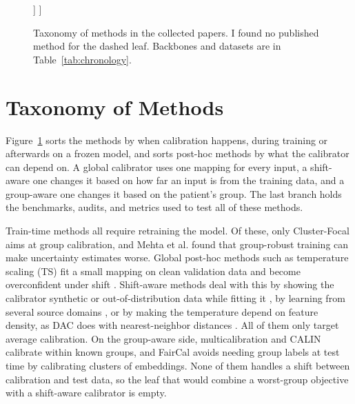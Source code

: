\documentclass[sigconf,nonacm]{acmart}
\begin{document}
\begin{figure}[t]
\begin{forest}
      ]
    ]
  \end{forest}
  \caption{Taxonomy of methods in the collected papers. I found no published method for the dashed leaf. Backbones and datasets are in Table~\ref{tab:chronology}.}
  \label{fig:taxonomy}
\end{figure}

\section{Taxonomy of Methods}
\label{sec:taxonomy}

Figure~\ref{fig:taxonomy} sorts the methods by when calibration happens, during training or afterwards on a frozen model, and sorts post-hoc methods by what the calibrator can depend on. A global calibrator uses one mapping for every input, a shift-aware one changes it based on how far an input is from the training data, and a group-aware one changes it based on the patient's group. The last branch holds the benchmarks, audits, and metrics used to test all of these methods.

Train-time methods all require retraining the model. Of these, only Cluster-Focal \cite{shui2023clusterfocal} aims at group calibration, and Mehta et al. \cite{mehta2023evaluating} found that group-robust training can make uncertainty estimates worse. Global post-hoc methods such as temperature scaling (TS) \cite{guo2017calibration} fit a small mapping on clean validation data and become overconfident under shift \cite{tomani2021posthoc}. Shift-aware methods deal with this by showing the calibrator synthetic or out-of-distribution data while fitting it \cite{tomani2021posthoc,roschewitz2025where}, by learning from several source domains \cite{gong2021confidence,yu2022multidomain}, or by making the temperature depend on feature density, as DAC does with nearest-neighbor distances \cite{tomani2023dac}. All of them only target average calibration. On the group-aware side, multicalibration \cite{hebertjohnson2018multicalibration} and CALIN \cite{shen2025calin} calibrate within known groups, and FairCal \cite{salvador2022faircal} avoids needing group labels at test time by calibrating clusters of embeddings. None of them handles a shift between calibration and test data, so the leaf that would combine a worst-group objective with a shift-aware calibrator is empty.
\end{document}
